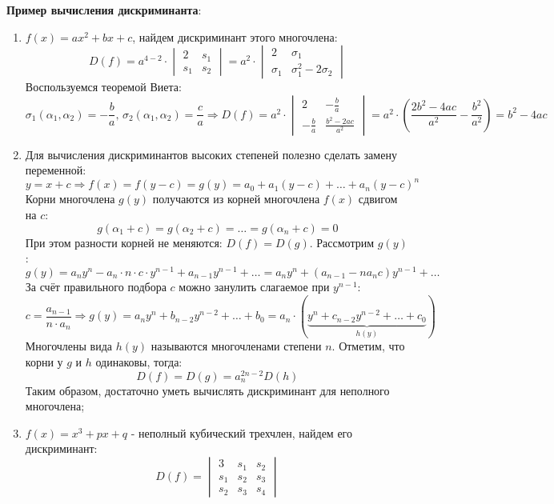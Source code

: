 \documentclass[12pt]{article}
\theoremstyle{definition}
\begin{document}
\textbf{Пример вычисления дискриминанта}:
\begin{enumerate}[label=\arabic*)]
	\item $f(x) = ax^2 + bx + c$, найдем дискриминант этого многочлена:
	$$
		D(f) = a^{4-2}{\cdot}
		\begin{vmatrix}
			2 & s_1 \\
			s_1 & s_2
		\end{vmatrix}
		= a^2{\cdot}
		\begin{vmatrix}
			2 & \sigma_1 \\
			\sigma_1 & \sigma_1^2 - 2\sigma_2
		\end{vmatrix}
	$$
	Воспользуемся теоремой Виета:
	$$
		\sigma_1(\alpha_1,\alpha_2) = -\dfrac{b}{a}, \, \sigma_2(\alpha_1,\alpha_2) = \dfrac{c}{a} \Rightarrow D(f) = a^2{\cdot}
		\begin{vmatrix}
			2 & -\tfrac{b}{a}\\[5pt]
			-\tfrac{b}{a} & \tfrac{b^2 - 2ac}{a^2}
		\end{vmatrix} =
		a^2{\cdot}\left(\dfrac{2b^2 - 4ac}{a^2} - \dfrac{b^2}{a^2}\right)= b^2 - 4ac
	$$
	\item Для вычисления дискриминантов высоких степеней полезно сделать замену переменной:
	$$
		y = x + c \Rightarrow f(x) = f(y - c) = g(y) = a_0 + a_1(y-c) + \dotsc + a_n(y - c)^n
	$$
	Корни многочлена $g(y)$ получаются из корней многочлена $f(x)$ сдвигом на $c$:
	$$
		g(\alpha_1 + c) = g(\alpha_2 + c) = \dotsc = g(\alpha_n + c) = 0
	$$
	При этом разности корней не меняются: $D(f) = D(g)$. Рассмотрим $g(y)$:
	$$
		g(y) = a_ny^n - a_n{\cdot}n{\cdot}c{\cdot}y^{n-1} + a_{n-1}y^{n-1} + \dotsc = a_ny^n + (a_{n-1} - na_nc)y^{n-1} + \dotsc 
	$$
	За счёт правильного подбора $c$ можно занулить слагаемое при $y^{n-1}$:
	$$
		c = \dfrac{a_{n-1}}{n{\cdot}a_n} \Rightarrow g(y) = a_ny^n + b_{n-2}y^{n-2} + \dotsc + b_0 = a_n{\cdot}(\underbrace{y^n + c_{n-2}y^{n-2} + \dotsc+ c_0}_{h(y)})
	$$
	Многочлены вида $h(y)$ называются  многочленами степени $n$. Отметим, что корни у $g$ и $h$ одинаковы, тогда:
	$$
		D(f) = D(g) = a_n^{2n-2}D(h)
	$$
	Таким образом, достаточно уметь вычислять дискриминант для неполного многочлена;
	\item $f(x) = x^3 +px + q$ - неполный кубический трехчлен, найдем его дискриминант:
	$$
		D(f) = 
		\begin{vmatrix}
			3 & s_1 & s_2 \\
			s_1 & s_2 & s_3 \\
			s_2 & s_3 & s_4
		\end{vmatrix}
$$
\end{enumerate}
\end{document}
